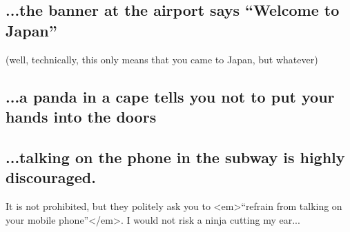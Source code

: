 \begin{post}
	\begin{content}	
\subsection{...the banner at the airport says ``Welcome to Japan''}
(well, technically, this only means that you came to Japan, but whatever)	

\subsection{...a panda in a cape tells you not to put your hands into the doors}
\begin{figure}[!h]
\centering
{}
\end{figure}

\subsection{...talking on the phone in the subway is highly discouraged.}
It is not prohibited, but they politely ask you to <em>``refrain from talking on your mobile phone''</em>. I would not risk a ninja cutting my ear...


\end{content}
\end{post}
